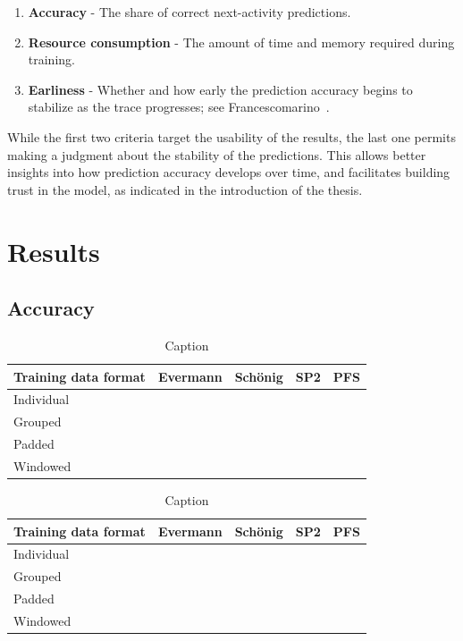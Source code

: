 \begin{enumerate}
    \item\textbf{Accuracy} - The share of correct next-activity predictions.
    \item\textbf{Resource consumption} - The amount of time and memory required during training.
    \item\textbf{Earliness} - Whether and how early the prediction accuracy begins to stabilize as the trace progresses; see Francescomarino~\cite{francescomarino2015}.
\end{enumerate}

While the first two criteria target the usability of the results, the last one permits making a judgment about the stability of the predictions. This allows better insights into how prediction accuracy develops over time, and facilitates building trust in the model, as indicated in the introduction of the thesis.

\section{Results}\label{sec:eval:results}


\subsection*{Accuracy}
\begin{table}
\centering
\begin{tabular}{l|cccc}
    Training data format & Evermann & Schönig & SP2 & PFS\\
    \hline
    Individual &&&\\
    Grouped &&&\\
    Padded &&&\\
    Windowed &&&\\
\end{tabular}
\caption{Caption}
\label{tab:accuracy_bpic2011}
\end{table}
\begin{table}
\centering
\begin{tabular}{l|cccc}
    Training data format & Evermann & Schönig & SP2 & PFS\\
    \hline
    Individual &&&\\
    Grouped &&&\\
    Padded &&&\\
    Windowed &&&\\
\end{tabular}
\caption{Caption}
\label{tab:accuracy_bpic2017}
\end{table}

